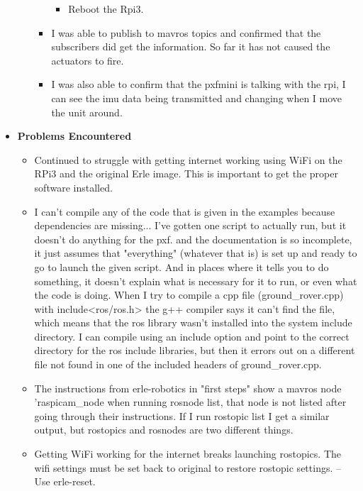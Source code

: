 \documentclass[compsoc,draftclsnofoot,onecolumn,10pt]{IEEEtran}
\begin{document}
\begin{itemize}
\begin{itemize}
\begin{itemize}
\begin{itemize}
                \item Reboot the Rpi3.
            \end{itemize}



        \item I was able to publish to mavros topics and confirmed that the subscribers did get the information. So far it has not caused the actuators to fire.

        \item I was also able to confirm that the pxfmini is talking with the rpi, I can see the imu data being transmitted and changing when I move the unit around.
        \end{itemize}
    \end{itemize}

    \item {\textbf{Problems Encountered}}
    \begin{itemize}
        \item Continued to struggle with getting internet working using WiFi on the RPi3 and the original Erle image. This is important to get the proper software installed.

        \item I can't compile any of the code that is given in the examples because dependencies are missing... I've gotten one script to actually run, but it doesn't do anything for the pxf. and the documentation is so incomplete, it just assumes that "everything" (whatever that is) is set up and ready to go to launch the given script. And in places where it tells you to do something, it doesn't explain what is necessary for it to run, or even what the code is doing. When I try to compile a cpp file (ground\_rover.cpp) with include<ros/ros.h> the g++ compiler says it can't find the file, which means that the ros library wasn't installed into the system include directory. I can compile using an include option and point to the correct directory for the ros include libraries, but then it errors out on a different file not found in one of the included headers of ground\_rover.cpp.

        \item The instructions from erle-robotics in "first steps" show a mavros node 'raspicam\_node when running rosnode list, that node is not listed after going through their instructions. If I run rostopic list I get a similar output, but rostopics and rosnodes are two different things.

        \item Getting WiFi working for the internet breaks launching rostopics. The wifi settings must be set back to original to restore rostopic settings. -- Use erle-reset.


\end{itemize}
\end{itemize}
\end{document}
